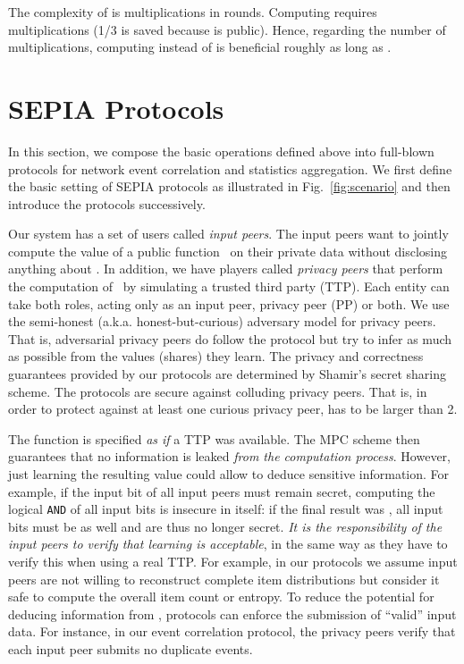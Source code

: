 \documentclass[letterpaper,11pt,onecolumn,titlepage]{article}
\begin{document}
The complexity of  is  multiplications in  rounds. 
Computing  requires  multiplications (1/3 is saved because  is public).
Hence, regarding the number of multiplications, computing  instead of  is beneficial roughly as long as .



\section{SEPIA Protocols}
\label{sec:protocols}

In this section, we compose the basic operations defined above into full-blown protocols for network event correlation and statistics aggregation.
We first define the basic setting of SEPIA protocols as illustrated in Fig.~\ref{fig:scenario} and then introduce the protocols successively.

Our system has a set of  users called \emph{input peers}. The input peers want to jointly compute the value of a public function~ on their private data  without disclosing anything about .
In addition, we have  players called \emph{privacy peers} that perform the computation of~ by simulating
a trusted third party (TTP). Each entity can take both roles, acting only as an input peer, privacy peer (PP) or both.
We use the semi-honest (a.k.a. honest-but-curious) adversary model for privacy peers. That is, adversarial
privacy peers do follow the protocol but try to infer as much as possible from the values (shares) they learn. 
The privacy and correctness guarantees provided by our protocols are determined by Shamir's secret
sharing scheme.
The protocols are secure against  colluding privacy peers. That is, in order to protect against at least one curious privacy peer,  has to be larger than 2.

The function  is specified \emph{as if} a TTP was available. The MPC scheme then guarantees that
no information is leaked \emph{from the computation process}. However, just learning the resulting value 
 could allow to deduce sensitive information.
For example, if the input bit of all input peers must remain secret, computing the logical \texttt{AND} of all
input bits is insecure in itself: if the final result was , all input bits must be  as well and are thus no longer secret.
\emph{It is the responsibility of the input peers to verify that learning  is acceptable}, 
in the same way as they have to verify this when using a real TTP.
For example, in our protocols we assume input peers are not willing to reconstruct complete item distributions but consider it
safe to compute the overall item count or entropy.
To reduce the potential for deducing information from , protocols can enforce the submission of ``valid'' input data.
For instance, in our event correlation protocol, the privacy peers verify that each input peer submits no duplicate events. 
\end{document}
